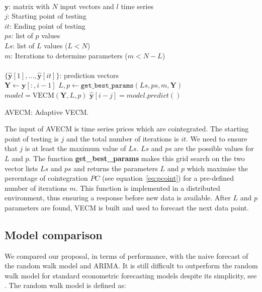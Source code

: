 \begin{algorithm}[ht!]
\begin{algorithmic}[1]
\REQUIRE $\,$ \\
$\mathbf{y}$: matrix with $N$ input vectors and $l$ time series\\
$j$: Starting point of testing \\
$it$: Ending point of testing \\
$ps$: list of $p$ values \\
$Ls$: list of $L$ values ($L<N$) \\
$m$: Iterations to determine parameters ($m < N-L$)\\
\ENSURE  $\,$ \\
$\{ \hat{\mathbf{y}}[1],\dots,\hat{\mathbf{y}}[it]\}$: prediction vectors \\
   \STATE $\mathbf{Y} \gets \mathbf{y}[:,i-1]$
    \STATE $L,p \gets
    \texttt{get\_best\_params}(Ls,ps,m,\mathbf{Y})$
        \STATE $model = \text{VECM}(\mathbf{Y},L, p)$
        \STATE $\hat{\mathbf{y}}[i-j] = model.predict()$
\ENDFOR
\end{algorithmic}
\caption{AVECM: Adaptive VECM.}
\label{alg:AVECM}
\end{algorithm}

The input of AVECM is time series prices which are cointegrated. The starting
point of testing is $j$ and the total number of iterations is $it$. We need to
ensure that $j$ is at least the maximum value of $Ls$. $Ls$ and $ps$ are the
possible values for $L$ and $p$.  The function {\bf get\_best\_params} makes
this grid search on the two vector lists $Ls$ and $ps$ and returns the
parameters $L$ and $p$ which maximise the percentage of cointegration $PC$ (see
equation~\ref{eq:pcoint}) for a pre-defined number of iterations $m$. This
function is implemented in a distributed environment, thus ensuring a response
before new data is available.  After $L$ and $p$ parameters are found, VECM is
built and used to forecast the next data point.


\subsection{Model comparison} \label{sec:random}
We compared our proposal, in terms of performance, with the naive forecast of
the random walk model and ARIMA. It is still difficult to outperform the random
walk model for standard econometric forecasting models  despite its
simplicity, see \cite{lo2011}. The random walk model is defined as:

